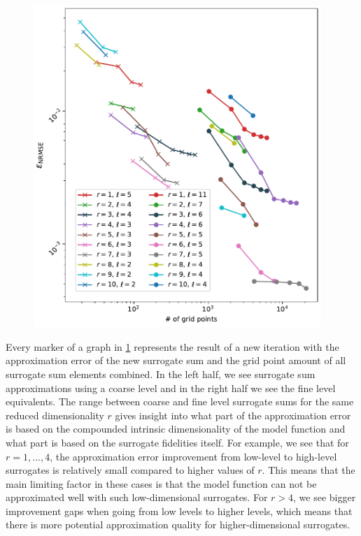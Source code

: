 \documentclass[
  a4paper,  %
  twoside,  %
  bibliography=totoc,
  headsepline,
  cleardoublepage=empty,
  parskip=half,
  draft=false
]{scrbook}
\begin{document}
\begin{mdframed}[style=style]
\begin{figure}[H]
\vspace{-2mm}
\includegraphics[width=0.97\textwidth]{graphics/wingweight_fixed}\vspace{-4mm}
\delimit
{}
\label{fig:wwf}
\end{figure}
\end{mdframed}
%
Every marker of a graph in \cref{fig:wwf} represents the result of a new iteration with the approximation error of the new surrogate sum and the grid point amount of all surrogate sum elements combined.
In the left half, we see surrogate sum approximations using a coarse level and in the right half we see the fine level equivalents.
The range between coarse and fine level surrogate sums for the same reduced dimensionality $r$ gives insight into what part of the approximation error is based on the compounded intrinsic dimensionality of the model function and what part is based on the surrogate fidelities itself.
For example, we see that for $r=1, \dots, 4$, the approximation error improvement from low-level to high-level surrogates is relatively small compared to higher values of $r$.
This means that the main limiting factor in these cases is that the model function can not be approximated well with such low-dimensional surrogates.
For $r > 4$, we see bigger improvement gaps when going from low levels to higher levels, which means that there is  more potential approximation quality for higher-dimensional surrogates.
\end{document}
